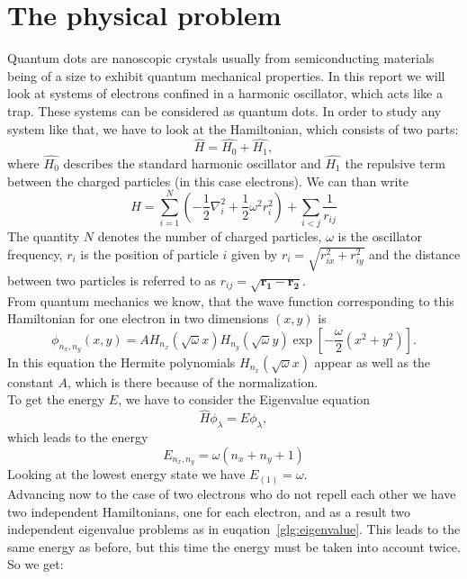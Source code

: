 \section{The physical problem}\label{sec:problem}
Quantum dots are nanoscopic crystals usually from semiconducting materials being of a size to exhibit quantum mechanical properties. In this report we will look at systems of electrons confined in a harmonic oscillator, which acts like a trap. These systems can be considered as quantum dots. In order to study any system like that, we have to look at the Hamiltonian, which consists of two parts:
\begin{equation}
\hat{H} = \hat{H_0} + \hat{H_1},
\end{equation}
where $\hat{H_0}$ describes the standard harmonic oscillator and $\hat{H_1}$ the repulsive term between the charged particles (in this case electrons). We can than write
\begin{equation}
\hat{H} = \sum_{i=1}^N \left( -\frac{1}{2} \nabla_i^2 + \frac{1}{2} \omega^2 r_i^2 \right) + \sum_{i<j} \frac{1}{r_{ij}}
\end{equation}
The quantity $N$ denotes the number of charged particles, $\omega$ is the oscillator frequency, $r_i$ is the position of particle $i$ given by $r_i = \sqrt{r_{ix}^2 + r_{iy}^2}$ and the distance between two particles is referred to as $r_{ij} = \sqrt{\mathbf{r_1}- \mathbf{r_2}}$.\\
From quantum mechanics we know, that the wave function corresponding to this Hamiltonian for one electron in two dimensions $(x,y)$ is
\begin{equation}\label{glg:wavefunc1}
\phi_{n_x,n_y}(x,y) = A H_{n_x} (\sqrt{\omega} x) H_{n_y} (\sqrt{\omega} y) \exp\left[-\frac{\omega}{2} (x^2+y^2)\right].
\end{equation}
In this equation the Hermite polynomials $H_{n_x} (\sqrt{\omega} x)$ appear as well as the constant $A$, which is there because of the normalization.\\
To get the energy $E$, we have to consider the Eigenvalue equation
\begin{equation}\label{glg:eigenvalue}
\hat{H} \phi_\lambda = E \phi_\lambda,
\end{equation}
which leads to the energy
\begin{equation}
E_{n_x,n_y} = \omega(n_x + n_y +1)
\end{equation}
Looking at the lowest energy state we have $E_{(1)}=\omega$.\\
Advancing now to the case of two electrons who do not repell each other we have two independent Hamiltonians, one for each electron, and as a result two independent eigenvalue problems as in euqation~\ref{glg:eigenvalue}. This leads to the same energy as before, but this time the energy must be taken into account twice. So we get:
